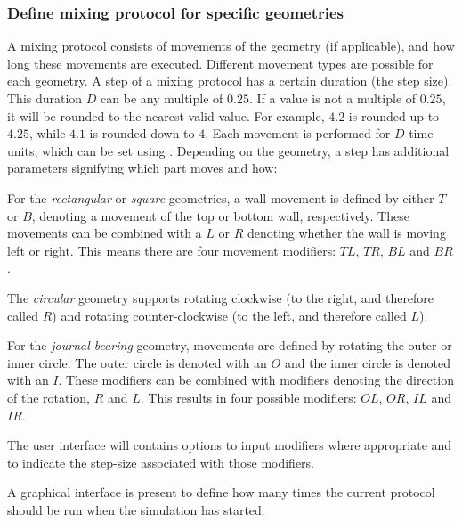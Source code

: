 \subsubsection{Define mixing protocol for specific geometries}
A mixing protocol consists of movements of the geometry (if applicable), and how long these movements are executed. Different movement types are possible for each geometry. A step of a mixing protocol has a certain duration (the step size). This duration $D$ can be any multiple of $0.25$. If a value is not a multiple of $0.25$, it will be rounded to the nearest valid value. For example, $4.2$ is rounded up to $4.25$, while $4.1$ is rounded down to $4$. Each movement is performed for $D$ time units, which can be set using . Depending on the geometry, a step has additional parameters signifying which part moves and how:

\fpstartparagraph{} For the \emph{rectangular} or \emph{square} geometries, a wall movement is defined by either $T$ or $B$, denoting a movement of the top or bottom wall, respectively. These movements can be combined with a $L$ or $R$ denoting whether the wall is moving left or right. This means there are four movement modifiers: $TL$, $TR$, $BL$ and $BR$. 

The \emph{circular} geometry supports rotating clockwise (to the right, and therefore called $R$) and rotating counter-clockwise (to the left, and therefore called $L$).

For the \emph{journal bearing} geometry, movements are defined by rotating the outer or inner circle. The outer circle is denoted with an $O$ and the inner circle is denoted with an $I$. These modifiers can be combined with modifiers denoting the direction of the rotation, $R$ and $L$. This results in four possible modifiers: $OL$, $OR$, $IL$ and $IR$.

The user interface will contains options to input modifiers where appropriate and to indicate the step-size associated with those modifiers.

\fpstartparagraph{} A graphical interface is present to define how many times the current protocol should be run when the simulation has started.



